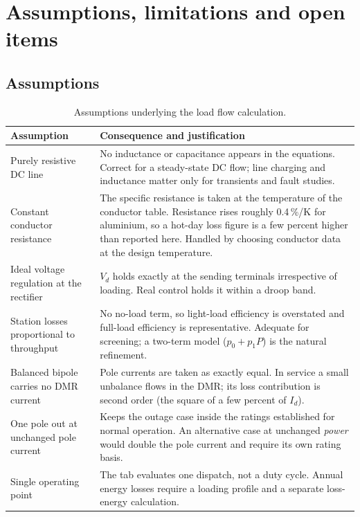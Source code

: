 \section{Assumptions, limitations and open items}
\label{sec:assumptions}

\subsection{Assumptions}
\begin{table}[htbp]
  \centering
  \small
  \renewcommand{\arraystretch}{1.25}
  \begin{tabularx}{\linewidth}{@{}l X@{}}
    \toprule
    \textbf{Assumption} & \textbf{Consequence and justification} \\
    \midrule
    Purely resistive DC line
      & No inductance or capacitance appears in the equations. Correct for a
        steady-state DC flow; line charging and inductance matter only for
        transients and fault studies. \\
    Constant conductor resistance
      & The specific resistance is taken at the temperature of the conductor
        table. Resistance rises roughly 0.4\,\%/K for aluminium, so a hot-day
        loss figure is a few percent higher than reported here. Handled by
        choosing conductor data at the design temperature. \\
    Ideal voltage regulation at the rectifier
      & $V_{d}$ holds exactly at the sending terminals irrespective of
        loading. Real control holds it within a droop band. \\
    Station losses proportional to throughput
      & No no-load term, so light-load efficiency is overstated and full-load
        efficiency is representative. Adequate for screening; a two-term
        model ($p_{0} + p_{1}P$) is the natural refinement. \\
    Balanced bipole carries no DMR current
      & Pole currents are taken as exactly equal. In service a small
        unbalance flows in the DMR; its loss contribution is second order
        (the square of a few percent of $I_{d}$). \\
    One pole out at unchanged pole current
      & Keeps the outage case inside the ratings established for normal
        operation. An alternative case at unchanged \emph{power} would double
        the pole current and require its own rating basis. \\
    Single operating point
      & The tab evaluates one dispatch, not a duty cycle. Annual energy losses
        require a loading profile and a separate loss-energy calculation. \\
    \bottomrule
  \end{tabularx}
  \caption{Assumptions underlying the load flow calculation.}
  \label{tab:assumptions}
\end{table}


